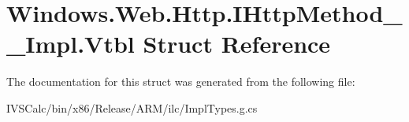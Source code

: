 \hypertarget{struct_windows_1_1_web_1_1_http_1_1_i_http_method_____impl_1_1_vtbl}{}\section{Windows.\+Web.\+Http.\+I\+Http\+Method\+\_\+\+\_\+\+Impl.\+Vtbl Struct Reference}
\label{struct_windows_1_1_web_1_1_http_1_1_i_http_method_____impl_1_1_vtbl}


The documentation for this struct was generated from the following file\+:\begin{DoxyCompactItemize}
\item 
I\+V\+S\+Calc/bin/x86/\+Release/\+A\+R\+M/ilc/Impl\+Types.\+g.\+cs\end{DoxyCompactItemize}
